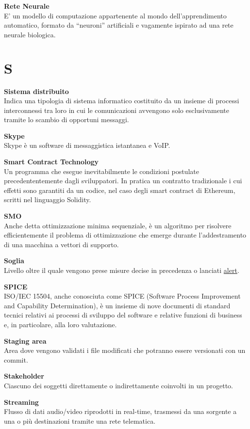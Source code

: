 \documentclass[a4paper, oneside, openany, dvipsnames, table, 12pt]{article}
\begin{document}
\textbf{Rete Neurale} \\
E’ un modello di computazione appartenente al mondo dell’apprendimento automatico, formato da “neuroni” artificiali e vagamente ispirato ad una rete neurale biologica.


\newpage
\section{S}
\textbf{Sistema distribuito} \\
Indica una tipologia di sistema informatico costituito da un insieme di processi interconnessi tra loro in cui le comunicazioni avvengono solo esclusivamente tramite lo scambio di opportuni messaggi.

\textbf{Skype} \\
Skype è un software di messaggistica istantanea e VoIP\glo.

\textbf{Smart Contract Technology} \\
Un programma che esegue inevitabilmente le condizioni postulate precedententemente dagli sviluppatori. In pratica un contratto tradizionale i cui effetti sono garantiti da un codice, nel caso degli smart contract di Ethereum, scritti nel linguaggio Solidity.


\label{par:SMO}
\textbf{SMO} \\
Anche detta ottimizzazione minima sequenziale, è un algoritmo per risolvere efficientemente il problema di ottimizzazione che emerge durante l'addestramento di una macchina a vettori di supporto.

\textbf{Soglia} \\
Livello oltre il quale vengono prese misure decise in precedenza o lanciati \hyperref[par:alert]{alert\glo}.

\textbf{SPICE} \\
ISO/IEC 15504, anche conosciuta come SPICE (Software Process Improvement and Capability Determination), è un insieme di nove documenti di standard tecnici relativi ai processi di sviluppo del software e relative funzioni di business e, in particolare, alla loro valutazione.

\textbf{Staging area} \\
Area dove vengono validati i file modificati che potranno essere versionati con un commit\glo.

\textbf{Stakeholder} \\
Ciascuno dei soggetti direttamente o indirettamente coinvolti in un progetto.

\textbf{Streaming} \\
Flusso di dati audio/video riprodotti in real-time, trasmessi da una sorgente a una o più destinazioni tramite una rete telematica.
\end{document}
